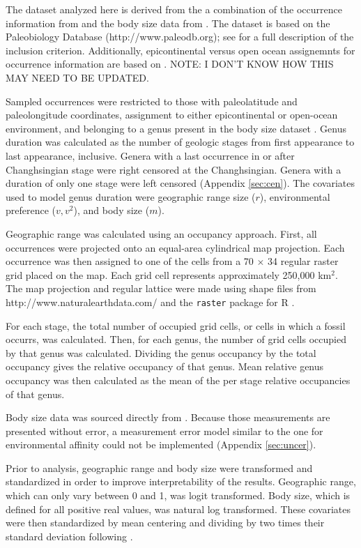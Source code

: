 \documentclass[12pt,letterpaper]{article}
\begin{document}
The dataset analyzed here is derived from the a combination of the occurrence information from \citet{Foote2013} and the body size data from \citet{Payne2014}. The \citet{Foote2013} dataset is based on the Paleobiology Database (http://www.paleodb.org); see \citet{Foote2013} for a full description of the inclusion criterion. Additionally, epicontinental versus open ocean assignemnts for occurrence information are based on \citet{Miller2009a}. \uppercase{note: I don't know how this may need to be updated.}

Sampled occurrences were restricted to those with paleolatitude and paleolongitude coordinates, assignment to either epicontinental or open-ocean environment, and belonging to a genus present in the body size dataset \citep{Payne2014}. Genus duration was calculated as the number of geologic stages from first appearance to last appearance, inclusive. Genera with a last occurrence in or after Changhsingian stage were right censored at the Changhsingian. Genera with a duration of only one stage were left censored (Appendix \ref{sec:cen}). The covariates used to model genus duration were geographic range size (\(r\)), environmental preference (\(v, v^{2}\)), and body size (\(m\)). 

Geographic range was calculated using an occupancy approach. First, all occurrences were projected onto an equal-area cylindrical map projection. Each occurrence was then assigned to one of the cells from a 70 \(\times\) 34 regular raster grid placed on the map. Each grid cell represents approximately 250,000 km\(^{2}\). The map projection and regular lattice were made using shape files from http://www.naturalearthdata.com/ and the \texttt{raster} package for R \citep{raster}.

For each stage, the total number of occupied grid cells, or cells in which a fossil occurrs, was calculated. Then, for each genus, the number of grid cells occupied by that genus was calculated. Dividing the genus occupancy by the total occupancy gives the relative occupancy of that genus. Mean relative genus occupancy was then calculated as the mean of the per stage relative occupancies of that genus. 

Body size data was sourced directly from \citet{Payne2014}. Because those measurements are presented without error, a measurement error model similar to the one for environmental affinity could not be implemented (Appendix \ref{sec:uncer}).

Prior to analysis, geographic range and body size were transformed and standardized in order to improve interpretability of the results. Geographic range, which can only vary between 0 and 1, was logit transformed. Body size, which is defined for all positive real values, was natural log transformed. These covariates were then standardized by mean centering and dividing by two times their standard deviation following \citet{Gelman2007}.
\end{document}
